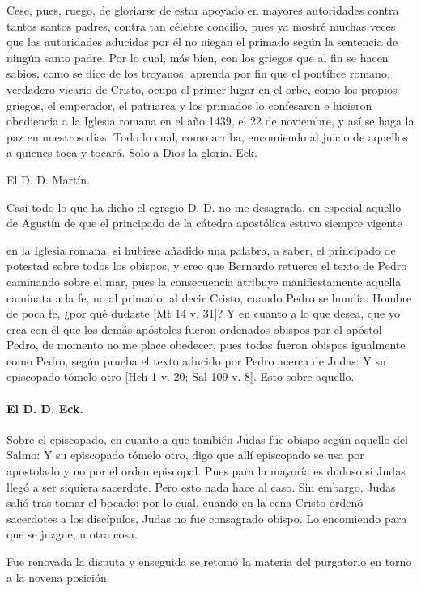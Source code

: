 Cese, pues, ruego, de gloriarse de estar apoyado en mayores autoridades contra tantos santos padres, contra tan célebre concilio, pues ya mostré muchas veces que las autoridades aducidas por él no niegan el primado según la sentencia de ningún santo padre. Por lo cual, más bien, con los griegos que al fin se hacen sabios, como se dice de los troyanos, aprenda por fin que el pontífice romano, verdadero vicario de Cristo, ocupa el primer lugar en el orbe, como los propios griegos, el emperador, el patriarca y los primados lo confesaron e hicieron obediencia a la Iglesia romana en el año 1439, el 22 de noviembre, y así se haga la paz en nuestros días. Todo lo cual, como arriba, encomiendo al juicio de aquellos a quienes toca y tocará. Solo a Dios la gloria. Eck.

\marginpar{\small[322]} El D. D. Martín.

Casi todo lo que ha dicho el egregio D. D. no me desagrada, en especial aquello de Agustín de que el principado de la cátedra apostólica estuvo siempre vigente

en la Iglesia romana, si hubiese añadido una palabra, a saber, el principado de potestad sobre todos los obispos, y creo que Bernardo retuerce el texto de Pedro caminando sobre el mar, pues la consecuencia atribuye manifiestamente aquella caminata a la fe, no al primado, al decir Cristo, cuando Pedro se hundía: Hombre de poca fe, ¿por qué dudaste [Mt 14 v. 31]? Y en cuanto a lo que desea, que yo crea con él que los demás apóstoles fueron ordenados obispos por el apóstol Pedro, de momento no me place obedecer, pues todos fueron obispos igualmente como Pedro, según prueba el texto aducido por Pedro acerca de Judas: Y su episcopado tómelo otro [Hch 1 v. 20; Sal 109 v. 8]. Esto sobre aquello.

\paragraph*{El D. D. Eck.}

Sobre el episcopado, en cuanto a que también Judas fue obispo según aquello del Salmo: Y su episcopado tómelo otro, digo que allí episcopado se usa por apostolado y no por el orden episcopal. Pues para la mayoría es dudoso si Judas llegó a ser siquiera sacerdote. Pero esto nada hace al caso. Sin embargo, Judas salió tras tomar el bocado; por lo cual, cuando en la cena Cristo ordenó sacerdotes a los discípulos, Judas no fue consagrado obispo. Lo encomiendo para que se juzgue, u otra cosa.

Fue renovada la disputa y enseguida se retomó la materia del purgatorio en torno a la novena posición.

